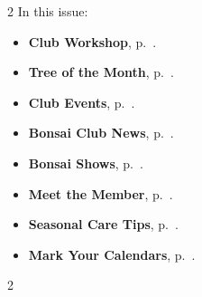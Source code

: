 \setlength{\columnsep}{-5.0cm}
\begin{multicols}{2}
    \noindent\textsf{In this issue:}
    \begin{itemize}
        \item \textsf{\textbf{Club Workshop}}, p.~\pageref{2025-09-workshop}.
        \item \textsf{\textbf{Tree of the Month}}, p.~\pageref{2025-09-contest}.
        \item \textsf{\textbf{Club Events}}, p.~\pageref{2025-09-calendar}.
        \item \textsf{\textbf{Bonsai Club News}}, p.~\pageref{2025-09-news}.
        \item \textsf{\textbf{Bonsai Shows}}, p.~\pageref{2025-09-show}.
        \item \textsf{\textbf{Meet the Member}}, p.~\pageref{2025-09-roots}.
        \item \textsf{\textbf{Seasonal Care Tips}}, p.~\pageref{2025-09-care}.
        \item \textsf{\textbf{Mark Your Calendars}}, p.~\pageref{2025-09-events}.
    \end{itemize}
    \vfill\null
    \columnbreak

    
\end{multicols}
\pagebreak

\setlength{\columnsep}{0.5cm}
\begin{multicols}{2}
    
    
    
    
    
    
    
    
    
\end{multicols}
